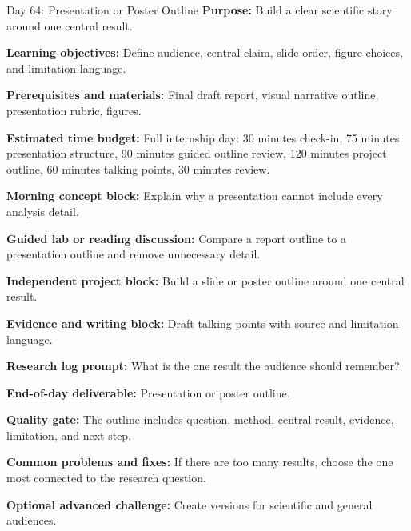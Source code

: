 \begin{dailybox}{Day 64: Presentation or Poster Outline}
\textbf{Purpose:} Build a clear scientific story around one central result.

\textbf{Learning objectives:} Define audience, central claim, slide order, figure choices, and limitation language.

\textbf{Prerequisites and materials:} Final draft report, visual narrative outline, presentation rubric, figures.

\textbf{Estimated time budget:} Full internship day: 30 minutes check-in, 75 minutes presentation structure, 90 minutes guided outline review, 120 minutes project outline, 60 minutes talking points, 30 minutes review.

\textbf{Morning concept block:} Explain why a presentation cannot include every analysis detail.

\textbf{Guided lab or reading discussion:} Compare a report outline to a presentation outline and remove unnecessary detail.

\textbf{Independent project block:} Build a slide or poster outline around one central result.

\textbf{Evidence and writing block:} Draft talking points with source and limitation language.

\textbf{Research log prompt:} What is the one result the audience should remember?

\textbf{End-of-day deliverable:} Presentation or poster outline.

\textbf{Quality gate:} The outline includes question, method, central result, evidence, limitation, and next step.

\textbf{Common problems and fixes:} If there are too many results, choose the one most connected to the research question.

\textbf{Optional advanced challenge:} Create versions for scientific and general audiences.
\end{dailybox}

